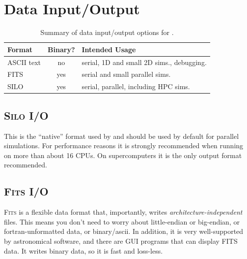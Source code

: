 \documentclass[a4paper,11pt]{report}
\begin{document}
\chapter{Data Input/Output}

\begin{table}
  \centering
  \caption{
    Summary of data input/output options for \pion{}.
  }
  \begin{tabular}{ l c l}
    Format & Binary? & Intended Usage \\
    \hline
    ASCII text & no   & serial, 1D and small 2D sims., debugging. \\
    FITS       & yes  & serial and small parallel sims. \\
    SILO       & yes  & serial, parallel, including HPC sims. \\
  \end{tabular}
  \label{tab:ioformats}
\end{table}


\section{\textsc{Silo} I/O}
This is the ``native'' format used by \pion{} and should be used by default for parallel simulations.
For performance reasons it is strongly recommended when running on more than about 16 CPUs.
On supercomputers it is the only output format recommended.


\section{\textsc{Fits} I/O}
\textsc{Fits} is a flexible data format that, importantly, writes \emph{architecture-independent} files.
This means you don't need to worry about little-endian or big-endian, or fortran-unformatted data, or binary/ascii.
In addition, it is very well-supported by astronomical software, and there are GUI programs that can display FITS data.
It writes binary data, so it is fast and loss-less.
\end{document}

